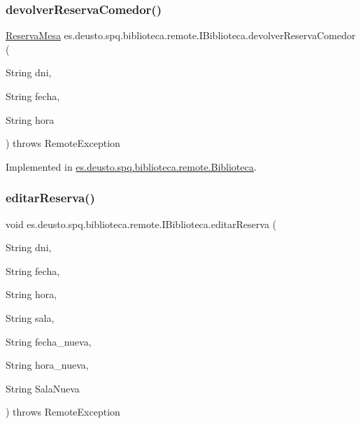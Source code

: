 \subsubsection{\texorpdfstring{devolver\+Reserva\+Comedor()}{devolverReservaComedor()}}
{\footnotesize\ttfamily \mbox{\hyperlink{classes_1_1deusto_1_1spq_1_1biblioteca_1_1data_1_1_reserva_mesa}{Reserva\+Mesa}} es.\+deusto.\+spq.\+biblioteca.\+remote.\+I\+Biblioteca.\+devolver\+Reserva\+Comedor (\begin{DoxyParamCaption}\item[{String}]{dni,  }\item[{String}]{fecha,  }\item[{String}]{hora }\end{DoxyParamCaption}) throws Remote\+Exception}



Implemented in \mbox{\hyperlink{classes_1_1deusto_1_1spq_1_1biblioteca_1_1remote_1_1_biblioteca_a42f0baaeb77d185634a84f10936e8f8e}{es.\+deusto.\+spq.\+biblioteca.\+remote.\+Biblioteca}}.

\mbox{\label{interfacees_1_1deusto_1_1spq_1_1biblioteca_1_1remote_1_1_i_biblioteca_aa7df9834f70a04eaa4ce64e30bce0ede}} 
\subsubsection{\texorpdfstring{editar\+Reserva()}{editarReserva()}}
{\footnotesize\ttfamily void es.\+deusto.\+spq.\+biblioteca.\+remote.\+I\+Biblioteca.\+editar\+Reserva (\begin{DoxyParamCaption}\item[{String}]{dni,  }\item[{String}]{fecha,  }\item[{String}]{hora,  }\item[{String}]{sala,  }\item[{String}]{fecha\+\_\+nueva,  }\item[{String}]{hora\+\_\+nueva,  }\item[{String}]{Sala\+Nueva }\end{DoxyParamCaption}) throws Remote\+Exception}



